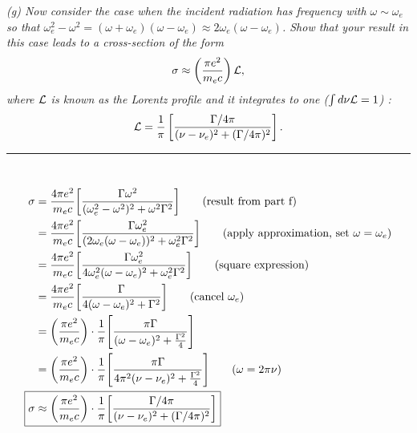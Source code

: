 \documentclass[12pt, letterpaper, twoside]{article}
\newcommand{\answer}[1]{
    \par\noindent\rule{\textwidth}{0.4pt}\\#1\\
}
\begin{document}
{\it \noindent (g) Now consider the case when the incident radiation has frequency
with $\omega\sim\omega_{e}$ so that $\omega_e^2 -\omega^2 =  (\omega+\omega_e) (\omega-\omega_e)  \approx 2 \omega_e  (\omega-\omega_e)$. Show that your result in this case leads to a cross-section of the form
\begin{equation}
\sigma \approx \left( \frac{\pi e^2}{m_e c}\right) {\cal L},
\end{equation}
\noindent
where ${\cal L}$ is known as the Lorentz profile and it integrates to one ($\int d\nu {\cal L} = 1$) :
\begin{equation}
 {\cal L} = \frac{1}{\pi} \left[ \frac{\Gamma/4\pi}{(\nu - \nu_e)^2 + (\Gamma/4\pi)^2} \right].
 \end{equation}}
 
 \answer{
    \begin{align*}
        \sigma &= \frac{4 \pi e^2}{m_e c} \qty[ \frac{\Gamma \omega^2}{(\omega_e^2 - \omega^2)^2 + \omega^2 \Gamma^2}] \tag{result from part f} \\
        &= \frac{4 \pi e^2}{m_e c} \qty[ \frac{\Gamma \omega_e^2}{(2 \omega_e (\omega - \omega_e))^2 + \omega_e^2 \Gamma^2}] \tag{apply approximation, set $\omega=\omega_e$} \\
        &= \frac{4 \pi e^2}{m_e c} \qty[ \frac{\Gamma \omega_e^2}{ 4 \omega_e^2 (\omega - \omega_e)^2 + \omega_e^2 \Gamma^2}] \tag{square expression} \\
        &= \frac{4 \pi e^2}{m_e c} \qty[ \frac{\Gamma}{ 4 (\omega - \omega_e)^2 + \Gamma^2}] \tag{cancel $\omega_e$} \\
        &= \qty(\frac{\pi e^2}{m_e c}) \cdot \frac{1}{\pi} \qty[ \frac{\pi \Gamma}{ (\omega - \omega_e)^2 + \frac{\Gamma^2}{4}}] \\
        &= \qty(\frac{\pi e^2}{m_e c}) \cdot \frac{1}{\pi} \qty[ \frac{\pi \Gamma}{ 4 \pi^2 (\nu - \nu_e)^2 + \frac{\Gamma^2}{4}}] \tag{$\omega = 2 \pi \nu$} \\
        \Aboxed{ \sigma &\approx \qty(\frac{\pi e^2}{m_e c}) \cdot \frac{1}{\pi} \qty[ \frac{\Gamma / 4 \pi}{ (\nu - \nu_e)^2 + (\Gamma / 4 \pi)^2}] }  \\
    \end{align*}
}
\end{document}
